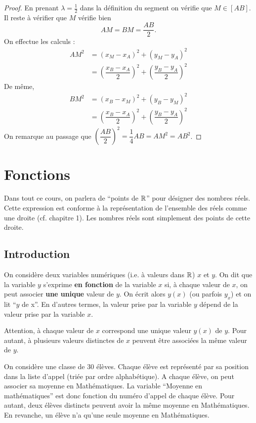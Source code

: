 \documentclass[a4paper, 12pt]{report}
\begin{document}
\begin{proof}
En prenant $\lambda = \frac12$ dans la définition du segment on vérifie que $M \in [AB]$. Il reste à vérifier que $M$ vérifie bien 
\[ AM = BM = \dfrac{AB}2 . \]
On effectue les calculs :
\begin{align*}
AM^2 & = (x_M - x_A)^2 + (y_M - y_A)^2 \\
& = \left (\dfrac{x_B - x_A}2 \right )^2 + \left (\dfrac{y_B - y_A}2 \right )^2 
\end{align*}
De même,
\begin{align*}
BM^2 & = (x_B - x_M)^2 + (y_B - y_M)^2 \\
& = \left (\dfrac{x_B - x_A}2 \right )^2 + \left (\dfrac{y_B - y_A}2 \right )^2 
\end{align*}
On remarque au passage que $\left (\dfrac{AB}2 \right )^2 = \dfrac14 AB  = AM^2 = AB^2$.
\end{proof}

\chapter{Fonctions}

Dans tout ce cours, on parlera de ``points de $\mathbb{R}$'' pour désigner des nombres réels. 
Cette expression est conforme à la représentation de l'ensemble des réels comme une droite (cf. chapitre 1).
Les nombres réels sont simplement des points de cette droite.

\section{Introduction}

\begin{defn}
On considère deux variables numériques (i.e. à valeurs dans $\mathbb{R}$) $x$ et $y$. On dit que la variable $y$ s'exprime \textbf{en fonction} de la variable $x$ si, à chaque valeur de $x$, on peut associer \textbf{une unique} valeur de $y$. On écrit alors $y(x)$ (ou parfois $y_x$) et on lit ``$y$ de x''. En d'autres termes, la valeur prise par la variable $y$ dépend de la valeur prise par la variable $x$.
\end{defn}

\begin{rmq}
Attention, à chaque valeur de $x$ correspond une unique valeur $y(x)$ de $y$. Pour autant, à plusieurs valeurs distinctes de $x$ peuvent être associées la même valeur de $y$. 
\end{rmq}

\begin{ex}
On considère une classe de 30 élèves. Chaque élève est représenté par sa position dans la liste d'appel (triée par ordre alphabétique). 
A chaque élève, on peut associer sa moyenne en Mathématiques. 
La variable ``Moyenne en mathématiques'' est donc fonction du numéro d'appel de chaque élève.
Pour autant, deux élèves distincts peuvent avoir la même moyenne en Mathématiques.
En revanche, un élève n'a qu'une seule moyenne en Mathématiques.
\end{ex}
\end{document}
